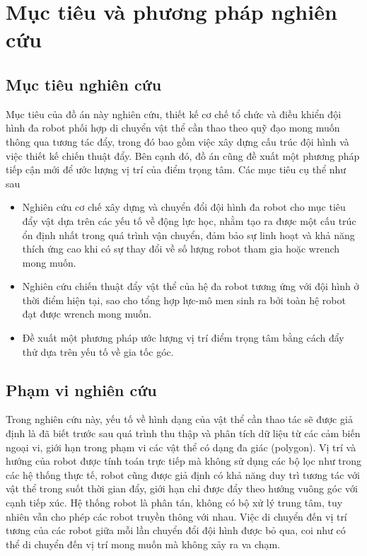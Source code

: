 \section{Mục tiêu và phương pháp nghiên cứu}
\subsection{Mục tiêu nghiên cứu}
Mục tiêu của đồ án này nghiên cứu, thiết kế cơ chế tổ chức và điều khiển đội hình đa robot phối hợp di chuyển vật thể cần thao theo quỹ đạo mong muốn thông qua tương tác đẩy, trong đó bao gồm việc xây dựng cấu trúc đội hình và việc thiết kế chiến thuật đẩy. Bên cạnh đó, đồ án cũng đề xuất một phương pháp tiếp cận mới để ước lượng vị trí của điểm trọng tâm. Các mục tiêu cụ thể như sau

\begin{itemize}
    \item Nghiên cứu cơ chế xây dựng và chuyển đổi đội hình đa robot cho mục tiêu đẩy vật dựa trên các yếu tố về động lực học, nhằm tạo ra được một cấu trúc ổn định nhất trong quá trình vận chuyển, đảm bảo sự linh hoạt và khả năng thích ứng cao khi có sự thay đổi về số lượng robot tham gia hoặc wrench mong muốn.
    \item Nghiên cứu chiến thuật đẩy vật thể của hệ đa robot tương ứng với đội hình ở thời điểm hiện tại, sao cho tổng hợp lực-mô men sinh ra bởi toàn hệ robot đạt được wrench mong muốn.
    \item Đề xuất một phương pháp ước lượng vị trí điểm trọng tâm bằng cách đẩy thử dựa trên yếu tố về gia tốc góc.
\end{itemize}

\subsection{Phạm vi nghiên cứu}
Trong nghiên cứu này, yếu tố về hình dạng của vật thể cần thao tác sẽ được giả định là đã biết trước sau quá trình thu thập và phân tích dữ liệu từ các cảm biến ngoại vi, giới hạn trong phạm vi các vật thể có dạng đa giác (polygon). Vị trí và hướng của robot được tính toán trực tiếp mà không sử dụng các bộ lọc như trong các hệ thống thực tế, robot cũng được giả định có khả năng duy trì tương tác với vật thể trong suốt thời gian đẩy, giới hạn chỉ được đẩy theo hướng vuông góc với cạnh tiếp xúc. Hệ thống robot là phân tán, không có bộ xử lý trung tâm, tuy nhiên vẫn cho phép các robot truyền thông với nhau. Việc di chuyển đến vị trí tương của các robot giữa mỗi lần chuyển đổi đội hình được bỏ qua, coi như có thể di chuyển đến vị trí mong muốn mà không xảy ra va chạm.

